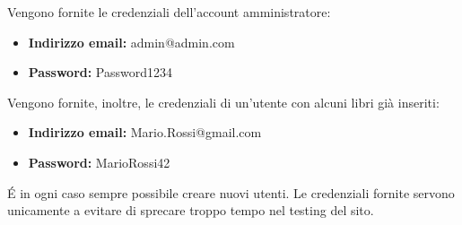Vengono fornite le credenziali dell'account amministratore:
\begin{itemize}
	\item \textbf{Indirizzo email:} admin@admin.com
	\item \textbf{Password:} Password1234
\end{itemize}

Vengono fornite, inoltre, le credenziali di un'utente con alcuni libri già inseriti:
\begin{itemize}
	\item \textbf{Indirizzo email:} Mario.Rossi@gmail.com
	\item \textbf{Password:} MarioRossi42
\end{itemize}

\'E in ogni caso sempre possibile creare nuovi utenti. Le credenziali fornite servono unicamente a evitare di sprecare troppo tempo nel testing del sito.